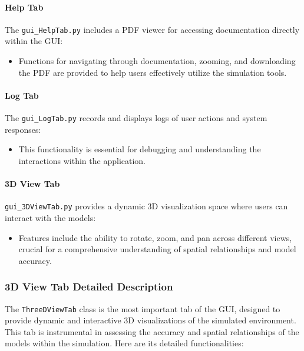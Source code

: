 \documentclass[../main.tex]{subfiles}
\begin{document}
\paragraph{Help Tab}
The \texttt{gui\_HelpTab.py} includes a PDF viewer for accessing documentation directly within the GUI:
\begin{itemize}
    \item Functions for navigating through documentation, zooming, and downloading the PDF are provided to help users effectively utilize the simulation tools.
\end{itemize}

\paragraph{Log Tab}
The \texttt{gui\_LogTab.py} records and displays logs of user actions and system responses:
\begin{itemize}
    \item This functionality is essential for debugging and understanding the interactions within the application.
\end{itemize}

\paragraph{3D View Tab}
\texttt{gui\_3DViewTab.py} provides a dynamic 3D visualization space where users can interact with the models:
\begin{itemize}
    \item Features include the ability to rotate, zoom, and pan across different views, crucial for a comprehensive understanding of spatial relationships and model accuracy.
\end{itemize}

\subsubsection{3D View Tab Detailed Description}
The \texttt{ThreeDViewTab} class is the most important tab of the GUI, designed to provide dynamic and interactive 3D visualizations of the simulated environment. This tab is instrumental in assessing the accuracy and spatial relationships of the models within the simulation. Here are its detailed functionalities:
\end{document}
